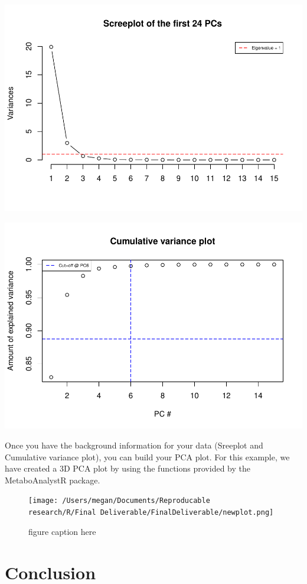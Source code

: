 \documentclass[]{elsarticle} %
\makeatletter
\def\maxwidth{\ifdim\Gin@nat@width>\linewidth\linewidth
\else\Gin@nat@width\fi}
\let\Oldincludegraphics\includegraphics
\renewcommand{\includegraphics}[1]{\Oldincludegraphics[width=\maxwidth]{#1}}
\makeatother
\begin{document}
\includegraphics{06DecFinalDeliverableArticle_files/figure-latex/unnamed-chunk-13-1.pdf}

\includegraphics{06DecFinalDeliverableArticle_files/figure-latex/unnamed-chunk-14-1.pdf}

Once you have the background information for your data (Sreeplot and
Cumulative variance plot), you can build your PCA plot. For this
example, we have created a 3D PCA plot by using the functions provided
by the MetaboAnalystR package.

\begin{figure}
\centering
\texttt{[image: /Users/megan/Documents/Reproducable research/R/Final Deliverable/FinalDeliverable/newplot.png]}
\caption{figure caption here}
\end{figure}

\hypertarget{conclusion}{%
\section{Conclusion}\label{conclusion}}
\end{document}
